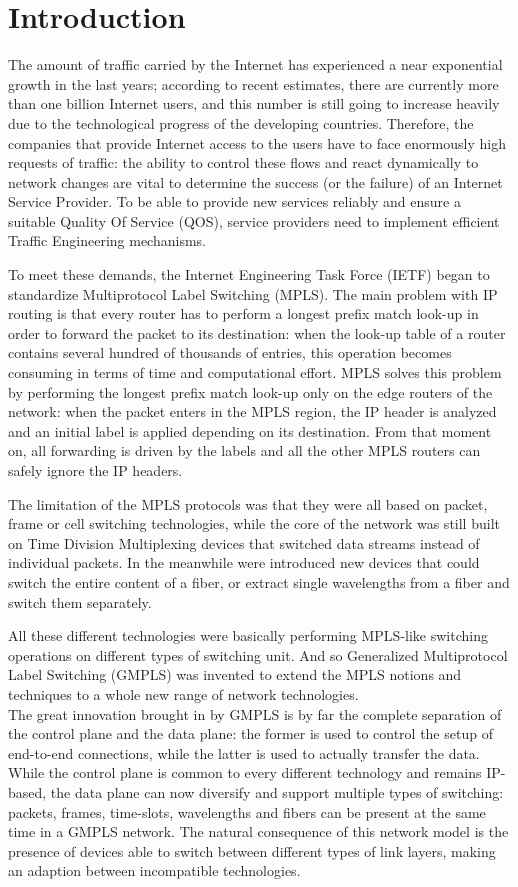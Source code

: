 \documentclass[10pt,a4paper]{report}
\begin{document}
\chapter{Introduction}
The amount of traffic carried by the Internet has experienced a near
exponential growth in the last years; according to recent estimates,
there are currently more than one billion Internet users, and this
number is still going to increase heavily due to the technological
progress of the developing countries. Therefore, the companies that
provide Internet access to the users have to face enormously high
requests of traffic: the ability to control these flows and react
dynamically to network changes are vital to determine the success (or
the failure) of an Internet Service Provider. To be able to provide
new services reliably and ensure a suitable Quality Of Service (QOS),
service providers need to implement efficient Traffic Engineering
mechanisms.

To meet these demands, the Internet Engineering Task Force (IETF)
began to standardize Multiprotocol Label Switching (MPLS). The main
problem with IP routing is that every router has to perform a longest
prefix match look-up in order to forward the packet to its
destination: when the look-up table of a router contains several
hundred of thousands of entries, this operation becomes consuming in
terms of time and computational effort. MPLS solves this problem by
performing the longest prefix match look-up only on the edge routers
of the network: when the packet enters in the MPLS region, the IP
header is analyzed and an initial label is applied depending on its
destination. From that moment on, all forwarding is driven by the
labels and all the other MPLS routers can safely ignore the IP
headers.

The limitation of the MPLS protocols was that they were all based on
packet, frame or cell switching technologies, while the core of the
network was still built on Time Division Multiplexing devices that
switched data streams instead of individual packets. In the meanwhile
were introduced new devices that could switch the entire content of a
fiber, or extract single wavelengths from a fiber and switch them
separately.

All these different technologies were basically performing MPLS-like
switching operations on different types of switching unit. And so
Generalized Multiprotocol Label Switching (GMPLS) was invented to
extend the MPLS notions and techniques to a whole new range of network
technologies. \\
The great innovation brought in by GMPLS is by far the complete
separation of the control plane and the data plane: the former is used
to control the setup of end-to-end connections, while the latter is
used to actually transfer the data. While the control plane is common
to every different technology and remains IP-based, the data plane can
now diversify and support multiple types of switching: packets,
frames, time-slots, wavelengths and fibers can be present at the same
time in a GMPLS network. The natural consequence of this network model
is the presence of devices able to switch between different types of
link layers, making an adaption between incompatible technologies.
\end{document}
